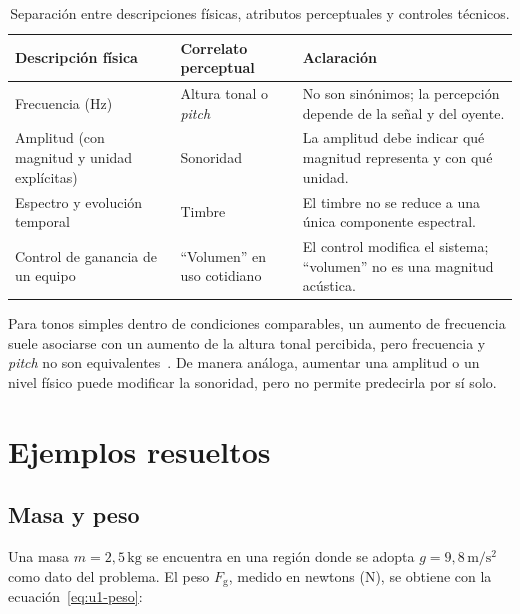 \begin{table}[htbp]
    \centering
    \setlength{\tabcolsep}{4pt}
    \begin{tabular}{|>{\raggedright\arraybackslash}p{}|>{\raggedright\arraybackslash}p{}|>{\raggedright\arraybackslash}p{}|}
        \hline
        \textbf{Descripción física} & \textbf{Correlato perceptual} & \textbf{Aclaración} \\
        \hline
        Frecuencia (\(\text{Hz}\)) & Altura tonal o \emph{pitch} & No son sinónimos; la percepción depende de la señal y del oyente. \\
        Amplitud (con magnitud y unidad explícitas) & Sonoridad & La amplitud debe indicar qué magnitud representa y con qué unidad. \\
        Espectro y evolución temporal & Timbre & El timbre no se reduce a una única componente espectral. \\
        Control de ganancia de un equipo & ``Volumen'' en uso cotidiano & El control modifica el sistema; ``volumen'' no es una magnitud acústica. \\
        \hline
    \end{tabular}
    \caption{Separación entre descripciones físicas, atributos perceptuales y controles técnicos.}
    \label{tab:u1-fisico-perceptual}
\end{table}

Para tonos simples dentro de condiciones comparables, un aumento de frecuencia suele asociarse con un aumento de la altura tonal percibida, pero frecuencia y \emph{pitch} no son equivalentes~\cite{oxenham2018}. De manera análoga, aumentar una amplitud o un nivel físico puede modificar la sonoridad, pero no permite predecirla por sí solo.

\section{Ejemplos resueltos}
\label{sec:u1-ejemplos}

\subsection{Masa y peso}
\label{sec:u1-ejemplo-peso}

Una masa \(m=2{,}5\,\text{kg}\) se encuentra en una región donde se adopta \(g=9{,}8\,\text{m}/\text{s}^{2}\) como dato del problema. El peso \(F_\mathrm{g}\), medido en newtons (\(\text{N}\)), se obtiene con la ecuación~\eqref{eq:u1-peso}:

